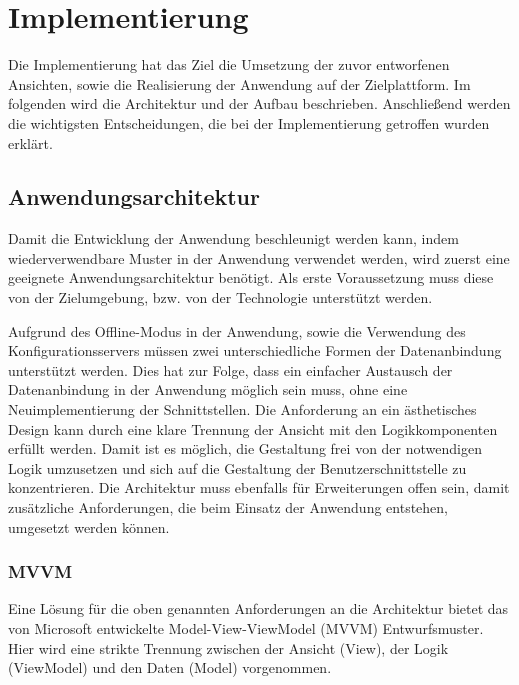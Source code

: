\chapter{Implementierung}\label{chapter_5}
 Die Implementierung hat das Ziel die Umsetzung der zuvor entworfenen Ansichten, sowie die Realisierung der Anwendung auf der Zielplattform. Im folgenden wird die Architektur und der Aufbau beschrieben. Anschließend werden die wichtigsten Entscheidungen, die bei der Implementierung getroffen wurden erklärt.

\section{Anwendungsarchitektur}
Damit die Entwicklung der Anwendung beschleunigt werden kann, indem wiederverwendbare Muster in der Anwendung verwendet werden, wird zuerst eine geeignete Anwendungsarchitektur benötigt. Als erste Voraussetzung muss diese von der Zielumgebung, bzw. von der Technologie unterstützt werden. \par 

Aufgrund des Offline-Modus in der Anwendung, sowie die Verwendung des Konfigurationsservers müssen zwei unterschiedliche Formen der Datenanbindung unterstützt werden. Dies hat zur Folge, dass ein einfacher Austausch der Datenanbindung in der Anwendung möglich sein muss, ohne eine Neuimplementierung der Schnittstellen. Die Anforderung an ein ästhetisches Design kann durch eine klare Trennung der Ansicht mit den Logikkomponenten erfüllt werden. Damit ist es möglich, die Gestaltung frei von der notwendigen Logik umzusetzen und sich auf die Gestaltung der Benutzerschnittstelle zu konzentrieren. Die Architektur muss ebenfalls für Erweiterungen offen sein, damit zusätzliche Anforderungen, die beim Einsatz der Anwendung entstehen, umgesetzt werden können.

\subsection{MVVM}
Eine Lösung für die oben genannten Anforderungen an die Architektur bietet das von Microsoft entwickelte Model-View-ViewModel (MVVM) Entwurfsmuster. Hier wird eine strikte Trennung zwischen der Ansicht (View), der Logik (ViewModel) und den Daten (Model) vorgenommen. \par 

